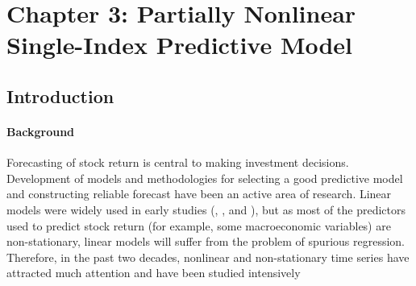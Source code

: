 \documentclass[a4paper,12pt,times,numbered,print,index]{report}
\numberwithin{equation}{section}
\begin{document}
		
		
		
		
		
		
		
		
		
		

		


\chapter*{Chapter 3: Partially Nonlinear Single-Index Predictive Model}

\section{Introduction}

\subsubsection{Background}

Forecasting of stock return is central to making investment decisions. Development of models and methodologies for selecting a good predictive model and constructing reliable forecast have been an active area of research. Linear models were widely used in early studies (\cite{campbell1988stock}, \cite{fama1990stock}, and \cite{pesaran1995predictability}), but as most of the predictors used to predict stock return (for example, some macroeconomic variables) are non-stationary, linear models will suffer from the problem of spurious regression. Therefore, in the past two decades, nonlinear and non-stationary time series have attracted much attention and have been studied intensively
\end{document}
